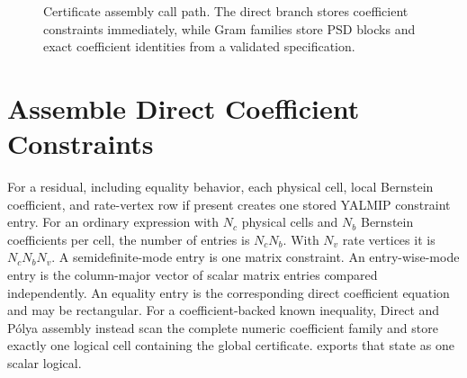 \begin{figure}[H]
\centering
{}
\caption{Certificate assembly call path. The direct branch stores coefficient constraints immediately, while Gram families store PSD blocks and exact coefficient identities from a validated specification.}
\label{fig:certificate-call-path}
\end{figure}

\section{Assemble Direct Coefficient Constraints}
\label{sec:pdlmi-direct}

For a  residual, including equality behavior, each physical cell, local Bernstein coefficient, and rate-vertex row if present creates one stored YALMIP constraint entry. For an ordinary expression with $N_c$ physical cells and $N_b$ Bernstein coefficients per cell, the number of entries is $N_cN_b$. With $N_v$ rate vertices it is $N_cN_bN_v$. A semidefinite-mode entry is one matrix constraint. An entry-wise-mode entry is the column-major vector of scalar matrix entries compared independently. An equality entry is the corresponding direct coefficient equation and may be rectangular. For a coefficient-backed known  inequality, Direct and P\'olya assembly instead scan the complete numeric coefficient family and store exactly one logical cell containing the global certificate.  exports that state as one scalar logical.

